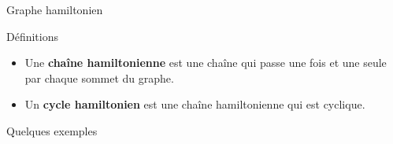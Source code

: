 \documentclass[10pt,xcolor=dvipsnames]{beamer}
\newcommand{\defin}[1]{\textcolor{darkspringgreen}{#1}}
\begin{document}
\begin{frame}{Graphe hamiltonien}
    \begin{exampleblock}{Définitions}
    \begin{itemize}
        \item Une \defin{\textbf{chaîne hamiltonienne}} est une chaîne qui passe une fois et une seule par chaque sommet du graphe.
        \item Un \defin{\textbf{cycle hamiltonien}} est une chaîne \defin{hamiltonienne} qui est cyclique.
    \end{itemize}
    \end{exampleblock}
    \begin{alertblock}{Quelques exemples}
    
    

\end{alertblock}
\end{frame}
\end{document}
